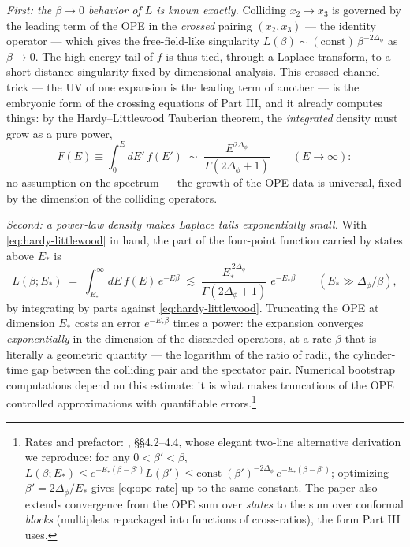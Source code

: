 \emph{First: the $\beta \to 0$ behavior of $L$ is known exactly.} Colliding
$x_2 \to x_3$ is governed by the leading term of the OPE in the
\emph{crossed} pairing $(x_2, x_3)$ --- the identity operator --- which gives
the free-field-like singularity $L(\beta) \sim (\text{const})\,
\beta^{-2\Delta_\phi}$ as $\beta \to 0$. The high-energy tail of $f$ is thus
tied, through a Laplace transform, to a short-distance singularity fixed by
dimensional analysis. This crossed-channel trick --- the UV of one expansion
is the leading term of another --- is the embryonic form of the crossing
equations of Part III, and it already computes things: by the Hardy--Littlewood
Tauberian theorem, the \emph{integrated} density must grow as a pure power,
\begin{equation}
F(E) \equiv \int_0^E dE'\, f(E') \;\sim\;
\frac{E^{2\Delta_\phi}}{\Gamma(2\Delta_\phi + 1)}
\qquad (E \to \infty):
\label{eq:hardy-littlewood}
\end{equation}
no assumption on the spectrum --- the growth of the OPE data is universal,
fixed by the dimension of the colliding operators.

\emph{Second: a power-law density makes Laplace tails exponentially small.}
With \eqref{eq:hardy-littlewood} in hand, the part of the four-point function
carried by states above $E_*$ is
\begin{equation}
L(\beta; E_*) \;=\; \int_{E_*}^\infty dE\, f(E)\, e^{-E\beta}
\;\lesssim\;
\frac{E_*^{\,2\Delta_\phi}}{\Gamma(2\Delta_\phi+1)}\; e^{-E_* \beta}
\qquad (E_* \gg \Delta_\phi/\beta),
\label{eq:ope-rate}
\end{equation}
by integrating by parts against \eqref{eq:hardy-littlewood}. Truncating the
OPE at dimension $E_*$ costs an error $e^{-E_*\beta}$ times a power: the
expansion converges \emph{exponentially} in the dimension of the discarded
operators, at a rate $\beta$ that is literally a geometric quantity --- the
logarithm of the ratio of radii, the cylinder-time gap between the colliding
pair and the spectator pair. Numerical bootstrap computations depend on this
estimate: it is what makes truncations of the OPE controlled approximations
with quantifiable errors.\footnote{Rates and prefactor:
, \S\S4.2--4.4, whose elegant two-line alternative derivation
we reproduce: for any $0 < \beta' < \beta$, $L(\beta; E_*) \le
e^{-E_*(\beta - \beta')} L(\beta')\le \text{const}\;
(\beta')^{-2\Delta_\phi}\, e^{-E_*(\beta-\beta')}$; optimizing $\beta' =
2\Delta_\phi/E_*$ gives \eqref{eq:ope-rate} up to the same constant. The
paper also extends convergence from the OPE sum over \emph{states} to the
sum over conformal \emph{blocks} (multiplets repackaged into functions of
cross-ratios), the form Part III uses.}

